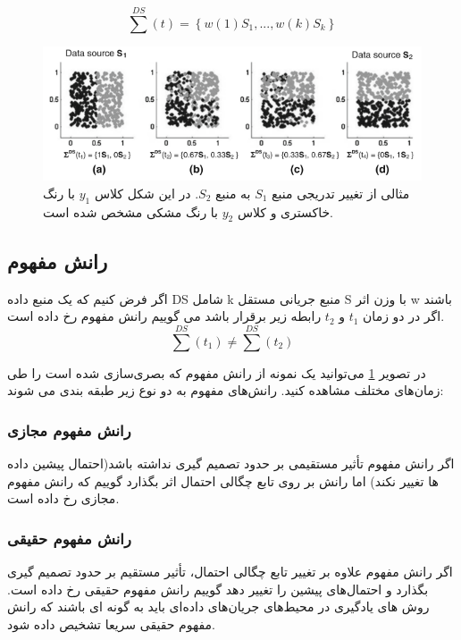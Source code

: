 \begin{equation}
\sum^{DS}(t) = \left\{ w(1)S_1, ..., w(k)S_k \right\}
\end{equation}


\begin{figure}%
\centerline{\includegraphics[width=15cm]{drift}}
\caption{مثالی از تغییر تدریجی منبع $S_1$ به منبع $S_2$. در این شکل کلاس $ y_1 $ با رنگ خاکستری و کلاس $ y_2 $ با رنگ مشکی مشخص شده است.}
\label{fig:drift}
\end{figure}




\subsection{رانش مفهوم}

 اگر فرض کنیم که یک منبع داده DS شامل k منبع جریانی مستقل S با وزن اثر w باشند اگر در دو زمان $t_1$ و $t_2$ رابطه زیر برقرار باشد می گوییم رانش مفهوم  رخ داده است.
\begin{equation}
\sum^{DS}(t_1) \neq \sum^{DS}(t_2)
\end{equation}

در تصویر
\ref{fig:drift}
می‌توانید یک نمونه از رانش مفهوم که بصری‌سازی شده است را طی زمان‌های مختلف مشاهده کنید.
رانش‌های مفهوم به دو نوع زیر طبقه بندی می شوند:

\subsubsection{رانش مفهوم مجازی}
اگر رانش مفهوم تأثیر مستقیمی بر حدود تصمیم گیری نداشته باشد(احتمال پیشین داده ها تغییر نکند) اما رانش بر روی تابع چگالی احتمال اثر بگذارد گوییم که رانش مفهوم مجازی  رخ داده است.

\subsubsection{رانش مفهوم حقیقی}
اگر رانش مفهوم علاوه بر تغییر تابع چگالی احتمال، تأثیر مستقیم بر حدود تصمیم گیری بگذارد و احتمال‌های پیشین را تغییر دهد گوییم رانش مفهوم حقیقی  رخ داده است. روش های یادگیری در محیط‌های جریان‌های داده‌ای باید به گونه ای باشند که رانش مفهوم حقیقی سریعا تشخیص داده شود.

